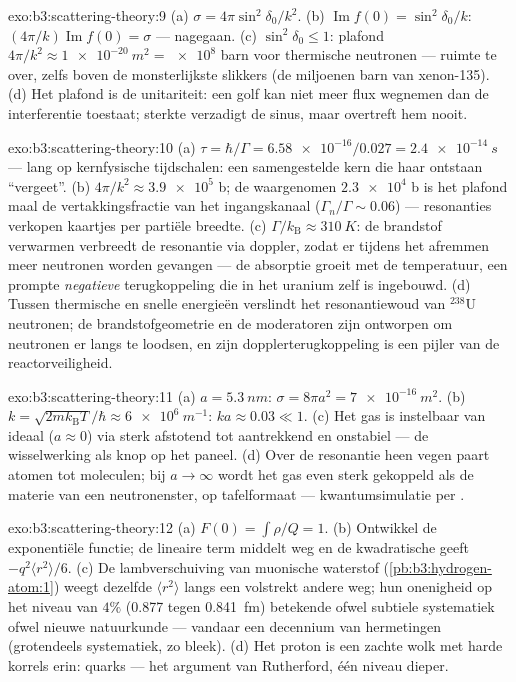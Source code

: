 \begin{solution}{exo:b3:scattering-theory:9}
(a) $\sigma = 4\pi\sin^2\delta_0/k^2$. (b) $\operatorname{Im}f(0)
= \sin^2\delta_0/k$: $(4\pi/k)\operatorname{Im}f(0) = \sigma$ ---
nagegaan. (c) $\sin^2\delta_0 \le 1$: plafond $4\pi/k^2 \approx
\qty{1e-20}{m^2} = \num{e8}$ barn voor thermische neutronen --- ruimte te
over, zelfs boven de monsterlijkste slikkers (de miljoenen barn van
xenon-135). (d) Het plafond is de unitariteit: een golf kan niet meer flux
wegnemen dan de interferentie toestaat; sterkte verzadigt de sinus, maar
overtreft hem nooit.
\end{solution}

\begin{solution}{exo:b3:scattering-theory:10}
(a) $\tau = \hbar/\Gamma = \num{6.58e-16}/0.027 =
\qty{2.4e-14}{s}$ ---
lang op kernfysische tijdschalen: een samengestelde kern die haar ontstaan
``vergeet''. (b) $4\pi/k^2 \approx
\num{3.9e5}$ b; de waargenomen
$\num{2.3e4}$ b is het plafond maal de vertakkingsfractie van het
ingangskanaal ($\Gamma_n/\Gamma
\sim 0.06$) --- resonanties verkopen
kaartjes per partiële breedte. (c) $\Gamma/k_{\text{B}} \approx \qty{310}{K}$: de brandstof verwarmen verbreedt de resonantie via doppler,
zodat er tijdens het afremmen meer neutronen worden gevangen --- de
absorptie groeit met de temperatuur, een prompte \emph{negatieve}
terugkoppeling die in het uranium zelf is ingebouwd. (d) Tussen thermische
en snelle energieën verslindt het resonantiewoud van $^{238}$U neutronen;
de brandstofgeometrie en de moderatoren zijn ontworpen om neutronen er
langs te loodsen, en zijn dopplerterugkoppeling is een pijler van de
reactorveiligheid.
\end{solution}

\begin{solution}{exo:b3:scattering-theory:11}
(a) $a = \qty{5.3}{nm}$: $\sigma = 8\pi a^2 = \qty{7e-16}{m^2}$.
(b) $k = \sqrt{2mk_{\text{B}}T}/\hbar \approx \qty{6e6}{m^{-1}}$:
$ka \approx 0.03 \ll 1$. (c) Het gas is instelbaar van ideaal ($a \approx 0$) via sterk afstotend tot aantrekkend en onstabiel --- de wisselwerking
als knop op het paneel. (d) Over de resonantie heen vegen paart atomen tot
moleculen; bij $a \to
\infty$ wordt het gas even sterk gekoppeld als de
materie van een neutronenster, op tafelformaat --- kwantumsimulatie per
.
\end{solution}

\begin{solution}{exo:b3:scattering-theory:12}
(a) $F(0) = \int\rho/Q = 1$. (b) Ontwikkel de exponentiële functie; de
lineaire term middelt weg en de kwadratische geeft $-q^2\langle r^2\rangle/6$. (c) De lambverschuiving van muonische waterstof
(\cref{pb:b3:hydrogen-atom:1}) weegt dezelfde $\langle r^2\rangle$ langs
een volstrekt andere weg; hun onenigheid op het niveau van $4\%$ (0.877
tegen \qty{0.841}{fm}) betekende ofwel subtiele systematiek ofwel nieuwe
natuurkunde --- vandaar een decennium van hermetingen (grotendeels
systematiek, zo bleek). (d) Het proton is een zachte wolk met harde
korrels erin: quarks --- het argument van Rutherford, één niveau dieper.
\end{solution}

